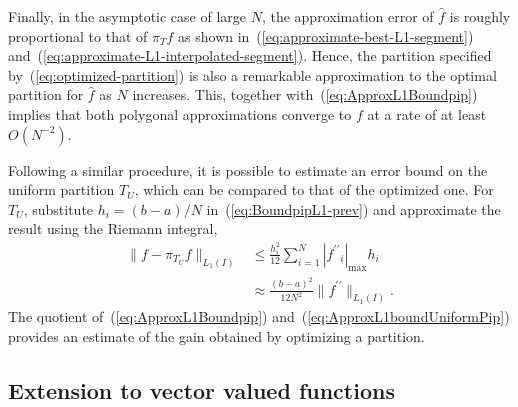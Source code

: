 \documentclass[a4paper,english]{IEEEtran}
\begin{document}
Finally, in the asymptotic case of large $N$, the approximation error
of ${\hat{f}}$ is roughly proportional to that of ${\pi_{T}}{f}$ as shown
in~(\ref{eq:approximate-best-L1-segment}) and~(\ref{eq:approximate-L1-interpolated-segment}).
Hence, the partition specified by~(\ref{eq:optimized-partition})
is also a remarkable approximation to the optimal partition for ${\hat{f}}$
as $N$ increases. This, together with~(\ref{eq:ApproxL1Boundpip})
implies that both polygonal approximations converge to ${f}$ at a
rate of at least $O(N^{-2})$.

Following a similar procedure, it is possible to estimate an error
bound on the uniform partition ${{T}_{U}}$, which can be compared
to that of the optimized one. For ${{T}_{U}}$, substitute $h_{i}=(b-a)/N$
in~(\ref{eq:BoundpipL1-prev}) and approximate the result using the
Riemann integral,
\begin{align}
\|{f}-{\pi_{{T}_{U}}}{f}\|_{{L_{1}}(I)} & \leq\frac{h_{i}^{2}}{12}\sum_{i=1}^{N}{|{{f}^{\prime\prime}}_{i}|_{\max}} h_{i}\nonumber \\
 & \approx\frac{\left(b-a\right)^{2}}{12N^{2}}\|{{f}^{\prime\prime}}\|_{{L_{1}}(I)}.\label{eq:ApproxL1boundUniformPip}
\end{align}
The quotient of~(\ref{eq:ApproxL1Boundpip}) and~(\ref{eq:ApproxL1boundUniformPip})
provides an estimate of the gain obtained by optimizing a partition.

\subsection{Extension to vector valued functions\label{sub:Extension-to-vectorfuncs}}
\end{document}
